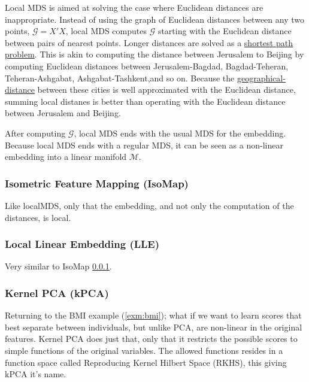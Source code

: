 \documentclass[]{book}
\theoremstyle{definition}
\theoremstyle{definition}
\theoremstyle{definition}
\theoremstyle{remark}
\begin{document}
Local MDS is aimed at solving the case where Euclidean distances are
inappropriate. Instead of using the graph of Euclidean distances between
any two points, \(\mathcal{G}=X'X\), local MDS computes \(\mathcal{G}\)
starting with the Euclidean distance between pairs of nearest points.
Longer distances are solved as a
\href{https://en.wikipedia.org/wiki/Shortest_path_problem}{shortest path
problem}. This is akin to computing the distance between Jerusalem to
Beijing by computing Euclidean distances between Jerusalem-Bagdad,
Bagdad-Teheran, Teheran-Ashgabat, Ashgabat-Tashkent,and so on. Because
the
\href{https://en.wikipedia.org/wiki/Geographical_distance}{geographical-distance}
between these cities is well approximated with the Euclidean distance,
summing local distanes is better than operating with the Euclidean
distance between Jerusalem and Beijing.

After computing \(\mathcal{G}\), local MDS ends with the usual MDS for
the embedding. Because local MDS ends with a regular MDS, it can be seen
as a non-linear embedding into a linear manifold \(\mathcal{M}\).

\subsubsection{Isometric Feature Mapping (IsoMap)}\label{isomap}

Like localMDS, only that the embedding, and not only the computation of
the distances, is local.

\subsubsection{Local Linear Embedding
(LLE)}\label{local-linear-embedding-lle}

Very similar to IsoMap \ref{isomap}.

\subsubsection{Kernel PCA (kPCA)}\label{kernel-pca-kpca}

Returning to the BMI example (\ref{exm:bmi}); what if we want to learn
scores that best separate between individuals, but unlike PCA, are
non-linear in the original features. Kernel PCA does just that, only
that it restricts the possible scores to simple functions of the
original variables. The allowed functions resides in a function space
called Reproducing Kernel Hilbert Space (RKHS), this giving kPCA it's
name.
\end{document}
